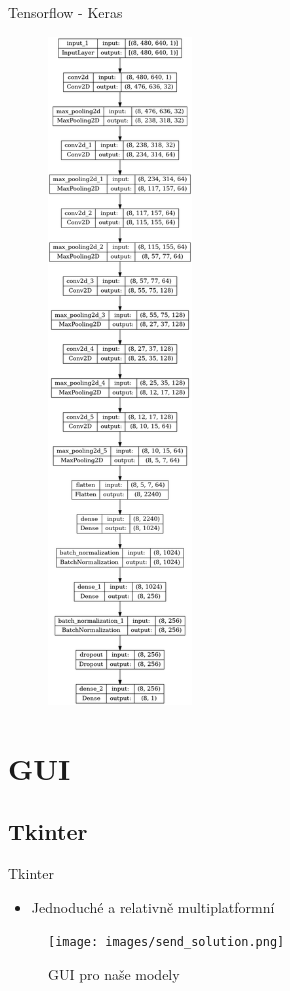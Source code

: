 \documentclass[aspectratio=169]{beamer}
\begin{document}
\begin{frame}{Tensorflow - Keras}
\begin{figure}
        \includegraphics[trim={0 0 0 51cm},clip,width=3.8cm]{model_plot.png} \hfill
    \end{figure}
\end{frame}

\section{GUI}

\subsection{Tkinter}

\begin{frame}{Tkinter}
    \begin{itemize}
        \item Jednoduché a relativně multiplatformní
    \end{itemize}
    \begin{figure}
        \centering
        \texttt{[image: images/send\_solution.png]}
        \caption{GUI pro naše modely}
    \end{figure}
\end{frame}
\end{document}
